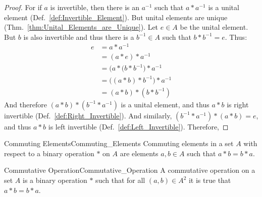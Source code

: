     \begin{proof}
        For if $a$ is invertible, then there is an $a^{\minus{1}}$ such that
        $a*a^{\minus{1}}$ is a unital element
        (Def.~\ref{def:Invertible_Element}). But unital elements are unique
        (Thm.~\ref{thm:Unital_Elements_are_Unique}). Let $e\in{A}$ be the unital
        element. But $b$ is also invertible and thus there is a
        $b^{\minus{1}}\in{A}$ such that $b*b^{\minus{1}}=e$. Thus:
        \begin{align}
            e&=a*a^{\minus{1}}
            \tag{Inverse Property}\\
            &=(a*e)*a^{\minus{1}}
            \tag{Identity}\\
            &=\big(a*(b*b^{\minus{1}}\big)*a^{\minus{1}}
            \tag{Inverse Property}\\
            &=\big((a*b)*b^{\minus{1}}\big)*a^{\minus{1}}
            \tag{Associativity}\\
            &=(a*b)*(b*b^{\minus{1}})
            \tag{Associativity}
        \end{align}
        And therefore $(a*b)*(b^{\minus{1}}*a^{\minus{1}})$ is a unital element,
        and thus $a*b$ is right invertible (Def.~\ref{def:Right_Invertible}).
        And similarly, $(b^{\minus{1}}*a^{\minus{1}})*(a*b)=e$, and thus
        $a*b$ is left invertible (Def.~\ref{def:Left_Invertible}). Therefore,
    \end{proof}
    \begin{fdefinition}{Commuting Elements}{Commuting_Elements}
        Commuting elements in a \gls{set} $A$ with respect to a
        \gls{binary operation} $*$ on $A$ are elements $a,b\in{A}$ such that
        $a*b=b*a$.
    \end{fdefinition}
    \begin{fdefinition}{Commutative Operation}{Commutative_Operation}
        A \gls{commutative operation} on a \gls{set} $A$ is a
        \gls{binary operation} $*$ such that for all $(a,b)\in{A}^{2}$ it is
        true that $a*b=b*a$.
    \end{fdefinition}